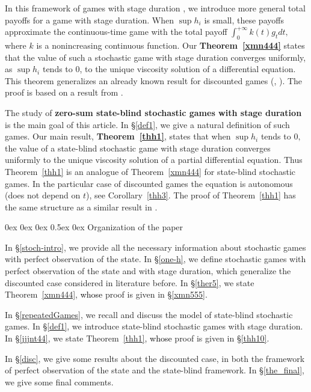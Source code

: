 \documentclass[english,openary,12pt]{article}
\makeatletter
\renewcommand\section{\@startsection {section}{1}{\z@}%
                                   {0ex \@plus 0ex \@minus 0ex}%
                                   {0.5ex \@plus0ex}%
                                   {\normalfont\LARGE\bfseries}}%
\newcommand{\red}[1]{\textcolor{black}{#1}}
\theoremstyle{definition}
\makeatother
\begin{document}
In this framework of games with stage duration \cite{Ney13}, we introduce more general total payoffs for a game with stage duration. When $\sup h_i$ is small, these payoffs approximate the continuous-time game with the total payoff $\int_0^{+\infty} k(t) g_t dt,$ where $k$ is a nonincreasing continuous function. Our \textbf{Theorem~\ref{xmn444}} states that the value of such a stochastic game with stage duration converges uniformly, as $\sup h_i$ tends to $0$, to the unique viscosity solution of a differential equation. This theorem generalizes an already known result for discounted games (\cite[Theorem~1]{Ney13}, \cite[Corollary 7.1]{SorVig16}). The proof is based on a result from \cite{Sor17}.

The study of \textbf{zero-sum state-blind stochastic games with stage duration} is the main goal of this article. In \S\ref{def1}, we give a natural definition of such games. Our main result, \textbf{Theorem~\ref{thh1}}, states that when $\sup h_i$ tends to $0,$ the value of a state-blind stochastic game with stage duration converges uniformly to the unique viscosity solution of a partial differential equation. Thus Theorem~\ref{thh1} is an analogue of Theorem~\ref{xmn444} for state-blind stochastic games. In the particular case of discounted games the equation is autonomous (does not depend on $t$), see Corollary~\ref{thh3}. The proof of Theorem~\ref{thh1} has the same structure as a similar result in \cite{Sor17}.

\section{Organization of the paper}

In \S\ref{stoch-intro}, we provide all the necessary information about stochastic games with perfect observation of the state. In \S\ref{one-h}, we define stochastic games with perfect observation of the state and with stage duration, which generalize the discounted case considered in literature before. In \S\ref{ther5}, we state Theorem~\ref{xmn444}, \red{whose} proof is given in \S\ref{xmn555}.

In \S\ref{repeatedGames}, we recall and discuss the model of state-blind stochastic games. In \S\ref{def1}, we introduce state-blind stochastic games with stage duration. In \S\ref{jjjnt44}, we state Theorem~\ref{thh1}, \red{whose} proof is given in \S\ref{thh10}.

In \S\ref{disc}, we give some results about the discounted case, in both the framework of perfect observation of the state and the state-blind framework. In \S\ref{the_final}, we give some final comments.
\end{document}
